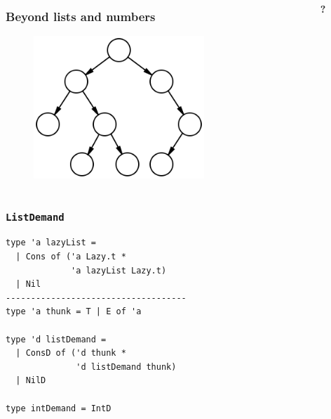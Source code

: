 \documentclass{beamer}
\begin{document}
\begin{frame}[fragile]
\begin{columns}
\begin{column}{0.7\textwidth}
\frametitle{Beyond lists and numbers}
\begin{figure}
\centering
\includegraphics[width=0.7\textwidth]{binary-tree}
\end{figure}
\end{column}
\begin{column}{0.2\textwidth}
{\fontsize{100}{50}\textrm{\textbf{?}}}
\end{column}
\end{columns}
\end{frame}


\begin{frame}[fragile]
\frametitle{\texttt{ListDemand}}
\begin{verbatim}
type 'a lazyList =
  | Cons of ('a Lazy.t *
             'a lazyList Lazy.t)
  | Nil
------------------------------------
type 'a thunk = T | E of 'a

type 'd listDemand =
  | ConsD of ('d thunk *
              'd listDemand thunk)
  | NilD

type intDemand = IntD
\end{verbatim}
\end{frame}
\end{document}
